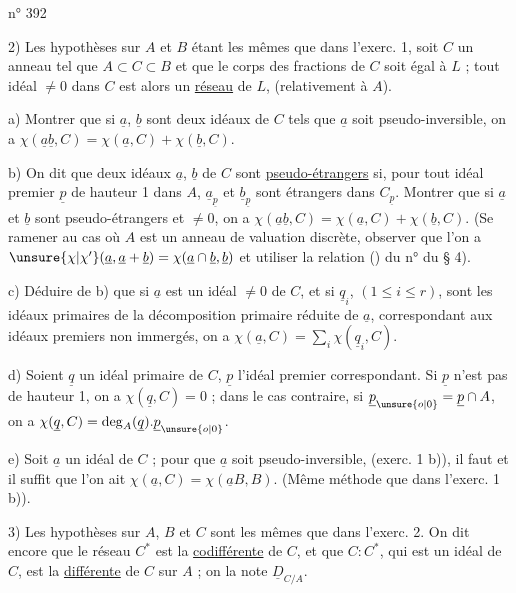 \hfill n° 392

2) Les hypothèses sur $A$ et $B$ étant les mêmes que dans l'exerc. 1, soit $C$ un anneau tel que $A\subset C\subset B$ et que le corps des fractions de $C$ soit égal à $L$ ; tout idéal $\ne0$ dans $C$ est alors un \uline{réseau} de $L$, (relativement à $A$).

a) Montrer que si $\underline a$, $\underline b$ sont deux idéaux de $C$ tels que $\underline a$ soit pseudo-inversible, on a $\chi(\underline a\underline b,C)=\chi(\underline a,C)+\chi(\underline b,C)$.

b) On dit que deux idéaux $\underline a$, $\underline b$ de $C$ sont \uline{pseudo-étrangers} si, pour tout idéal premier $\underline p$ de hauteur 1 dans $A$, $\underline a_{\underline p}$ et $\underline b_{\underline p}$ sont étrangers dans $C_{\underline p}$. Montrer que si $\underline a$ et $\underline b$ sont pseudo-étrangers et $\ne0$, on a $\chi(\underline a\underline b,C)=\chi(\underline a,C)+\chi(\underline b,C)$. (Se ramener au cas où $A$ est un anneau de valuation discrète, observer que l'on a $\unsure{\chi|\chi'}(\underline a,\underline a+\underline b)=\chi(\underline a\cap\underline b,\underline b)$ et utiliser la relation (\quad) du n° \quad du \S{} 4).

c) Déduire de b) que si $\underline a$ est un idéal $\ne0$ de $C$, et si $\underline q_i$, $(1\leq i\leq r)$, sont les idéaux primaires de la décomposition primaire réduite de $\underline a$, correspondant aux idéaux premiers non immergés, on a $\chi(\underline a,C)=\sum_i\chi(\underline q_i,C)$.

d) Soient $\underline q$ un idéal primaire de $C$, $\underline p$ l'idéal premier correspondant. Si $\underline p$ n'est pas de hauteur 1, on a $\chi(\underline q,C)=0$ ; dans le cas contraire, si $\underline p_{\unsure{o|0}}=\underline p\cap A$, on a $\chi(\underline q,C)=\operatorname{deg}_A(\underline q).\underline p_{\unsure{o|0}}$.

e) Soit $\underline a$ un idéal de $C$ ; pour que $\underline a$ soit pseudo-inversible, (exerc. 1 b)), il faut et il suffit que l'on ait $\chi(\underline a,C)=\chi(\underline a B,B)$. (Même méthode que dans l'exerc. 1 b)).

3) Les hypothèses sur $A$, $B$ et $C$ sont les mêmes que dans l'exerc. 2. On dit encore que le réseau $C^*$ est la \uline{codifférente} de $C$, et que $C:C^*$, qui est un idéal de $C$, est la \uline{différente} de $C$ sur $A$ ; on la note $\underline D_{C/A}$.

